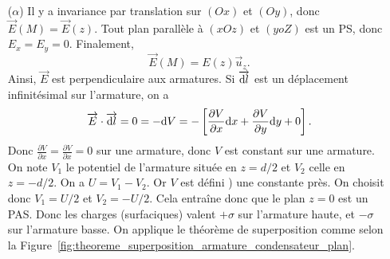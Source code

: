             \begin{enumerate}
                \item [($\alpha$)] Il y a invariance par translation sur $(Ox)$ et $(Oy)$, donc $\vec{E}(M)=\vec{E}(z)$. Tout plan parallèle à $(xOz)$ et $(yoZ)$ est un PS, donc $E_x=E_y=0$. Finalement,
                \begin{equation}
                    \vec{E}(M)=E(z)\vec{u}_z.
                \end{equation}
                Ainsi, $\vec{E}$ est perpendiculaire aux armatures. Si $\protect\overrightarrow{{\mathrm{d} l}}$ est un déplacement infinitésimal sur l'armature, on a 
                \begin{equation}
                    \protect\overrightarrow{{E}}\cdot\protect\overrightarrow{{\mathrm{d} l}}=0=-\mathrm{d} V=-\left[
                        \frac{\partial V}{\partial x}\mathrm{d} x+\frac{\partial V}{\partial y}\mathrm{d} y+0
                    \right].
                \end{equation}
                Donc $\frac{\partial V}{\partial x}=\frac{\partial V}{\partial x}=0$ sur une armature, donc $V$ est constant sur une armature. On note $V_1$ le potentiel de l'armature située en $z=d/2$ et $V_2$ celle en $z=-d/2$. On a $U=V_1-V_2$. Or $V$ est défini ) une constante près. On choisit donc $V_1=U/2$ et $V_2=-U/2$. Cela entraîne donc que le plan $z=0$ est un PAS. Donc les charges (surfaciques) valent $+\sigma$ sur l'armature haute, et $-\sigma$ sur l'armature basse. On applique le théorème de superposition comme selon la Figure~\ref{fig:theoreme_superposition_armature_condensateur_plan}.
                \begin{figure}
                    \centering
\end{figure}
\end{enumerate}
